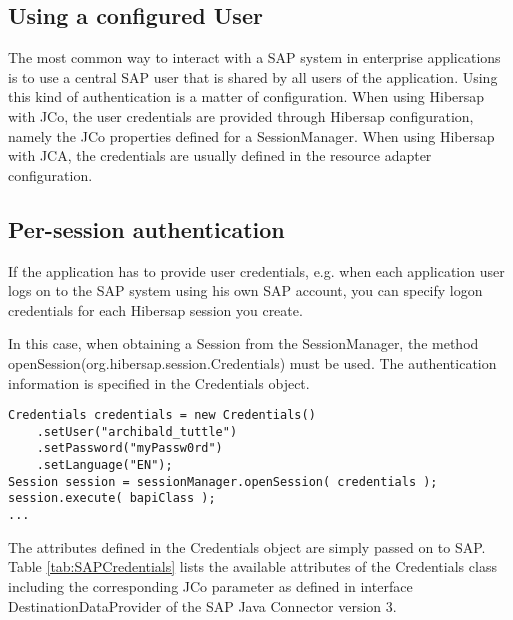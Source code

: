 \subsection{Using a configured User}

The most common way to interact with a SAP system in enterprise applications is to use a central SAP user that is shared by all users of the application. Using this kind of authentication is a matter of configuration. When using Hibersap with JCo, the user credentials are provided through Hibersap configuration, namely the JCo properties defined for a SessionManager. When using Hibersap with JCA, the credentials are usually defined in the resource adapter configuration.

\subsection{Per-session authentication}
\label{sec:PerSessionAuthentication}

If the application has to provide user credentials, e.g. when each application user logs on to the SAP system using his own SAP account, you can specify logon credentials for each Hibersap session you create.

In this case, when obtaining a Session from the SessionManager, the method \\openSession(org.hibersap.session.Credentials) must be used. The authentication information is specified in the Credentials object.

\begin{lstlisting}[caption=Component managed authentication]
Credentials credentials = new Credentials()
    .setUser("archibald_tuttle")
    .setPassword("myPassw0rd")
    .setLanguage("EN");
Session session = sessionManager.openSession( credentials );
session.execute( bapiClass );
...
\end{lstlisting}

The attributes defined in the Credentials object are simply passed on to SAP. Table \ref{tab:SAPCredentials} lists the available attributes of the Credentials class including the corresponding JCo parameter as defined in interface DestinationDataProvider of the SAP Java Connector version 3.

